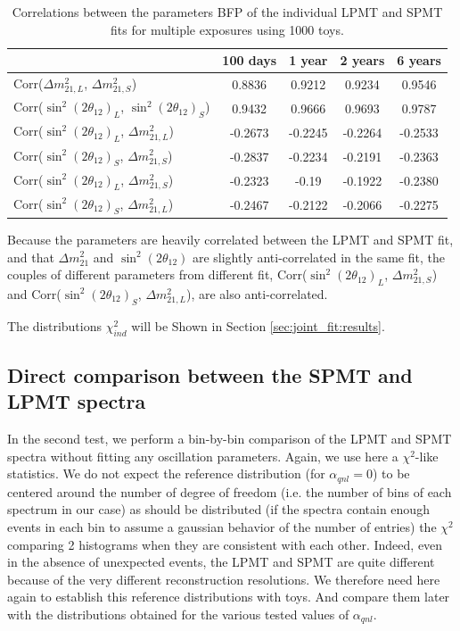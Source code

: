 \documentclass[../main.tex]{subfiles}
\begin{document}
\begin{table}
  \centering
  \begin{tabular}{l|c|c|c|c}
                                                                  & 100 days & 1 year & 2 years & 6 years \\
    \hline
    \hline
    Corr($\Delta m^2_{21,L}$,  $\Delta m^2_{21,S}$)               & 0.8836   & 0.9212 & 0.9234  & 0.9546 \\
    Corr($\sin^2(2\theta_{12})_{L}$, $\sin^2(2\theta_{12})_{S}$)  & 0.9432   & 0.9666 & 0.9693  & 0.9787 \\
    \hline
    Corr($\sin^2(2\theta_{12})_{L}$, $\Delta m^2_{21,L}$)         & -0.2673 & -0.2245 & -0.2264 & -0.2533 \\
    Corr($\sin^2(2\theta_{12})_{S}$, $\Delta m^2_{21,S}$)         & -0.2837 & -0.2234 & -0.2191 & -0.2363 \\
    \hline
    Corr($\sin^2(2\theta_{12})_{L}$, $\Delta m^2_{21,S}$)         & -0.2323 & -0.19   & -0.1922 & -0.2380 \\
    Corr($\sin^2(2\theta_{12})_{S}$, $\Delta m^2_{21,L}$)         & -0.2467 & -0.2122 & -0.2066 & -0.2275 \\
  \end{tabular}
  \caption{Correlations between the parameters BFP of the individual LPMT and SPMT fits for multiple exposures using 1000 toys.}
  \label{tab:joint_fit:ind_corr}
\end{table}

Because the parameters are heavily correlated between the LPMT and SPMT fit, and that $\Delta m^2_{21}$ and $\sin^2(2\theta_{12})$ are slightly anti-correlated in the same fit, the couples of different parameters from different fit, Corr($\sin^2(2\theta_{12})_{L}$, $\Delta m^2_{21,S}$) and Corr($\sin^2(2\theta_{12})_{S}$, $\Delta m^2_{21,L}$), are also anti-correlated.

The distributions $\chi^2_{ind}$ will be Shown in Section \ref{sec:joint_fit:results}.


\subsection{Direct comparison between the SPMT and LPMT spectra}
\label{sec:joint_fit:compar}

In the second test, we perform a bin-by-bin comparison of the LPMT and SPMT spectra without fitting any oscillation parameters.
Again, we use here a $\chi^2$-like statistics.
We do not expect the reference distribution (for $\alpha_{qnl}=0$) to be centered around the number of degree of freedom (i.e. the number of bins of each spectrum in our case) as should be distributed (if the spectra contain enough events in each bin to assume a gaussian behavior of the number of entries) the $\chi^2$ comparing 2 histograms when they are consistent with each other. Indeed, even in the absence of unexpected events, the LPMT and SPMT are quite different because of the very different reconstruction resolutions. We therefore need here again to establish this reference distributions with toys. And compare them later with the distributions obtained for the various tested values of $\alpha_{qnl}$.
\end{document}
